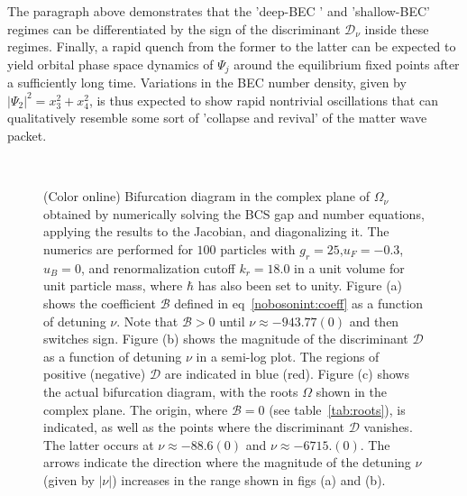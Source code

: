 \documentclass[a4paper,10pt]{article}
\begin{document}
The paragraph above demonstrates that the 'deep-BEC ' and 'shallow-BEC' regimes can be differentiated by the sign of the discriminant $\mathcal{D}_\nu$ inside these regimes. Finally, a rapid quench from the former to the latter can be expected to yield orbital phase space dynamics of $\Psi_j$ around the equilibrium fixed points after a sufficiently long time. Variations in the BEC number density, given by $|\Psi_2|^2 = x^2_3 + x^2_4$, is thus expected to show rapid nontrivial oscillations that can qualitatively resemble some sort of 'collapse and revival' of the matter wave packet.
\begin{figure}[h!bt]
\ 
\caption{(Color online) Bifurcation diagram in the complex plane of $\Omega_\nu$ obtained by numerically solving the BCS gap and number equations, applying the results to the Jacobian, and diagonalizing it. The numerics are performed for $100$ particles with $g_r=25$,$u_F = -0.3$,$u_B=0$, and renormalization cutoff $k_r=18.0$ in a unit volume for unit particle mass, where $\hbar$ has also been set to unity. Figure (a) shows the coefficient $\mathcal{B}$ defined in eq~\ref{nobosonint:coeff} as a function of detuning $\nu$. Note that $\mathcal{B} > 0$ until $\nu \approx -943.77(0)$ and then switches sign. Figure (b) shows the magnitude of the discriminant $\mathcal{D}$ as a function of detuning $\nu$ in a semi-log plot. The regions of positive (negative) $\mathcal{D}$ are indicated in blue (red). Figure (c) shows the actual bifurcation diagram, with the roots $\Omega$ shown in the complex plane. The origin, where $\mathcal{B}=0$ (see table~\ref{tab:roots}), is indicated, as well as the points where the discriminant $\mathcal{D}$ vanishes. The latter occurs at $\nu\approx-88.6(0)$ and $\nu\approx-6715.(0)$. The arrows indicate the direction where the magnitude of the detuning $\nu$ (given by $|\nu|$) increases in the range shown in figs (a) and (b).}
\label{fig:bif:nobosonint}
\end{figure}
\end{document}
